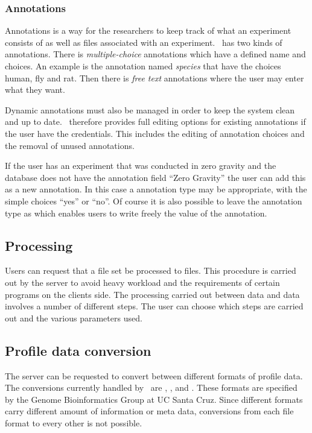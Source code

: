 \subsubsection{Annotations}
Annotations is a way for the researchers to keep track of what an experiment consists of as well as files associated with an experiment.
\appName\ has two kinds of annotations. There is \textit{multiple-choice} annotations which have a defined name and choices. An example is the annotation named \textit{species} that have the choices human, fly and rat.
Then there is \textit{free text} annotations where the user may enter what they want.

Dynamic annotations must also be managed in order to keep the system clean and up to date. \appName\ therefore provides full editing options for existing annotations if the user have the credentials. This includes the editing of  annotation choices and the removal of unused annotations.

\begin{example}
If the user has an experiment that was conducted in zero gravity and the database does not have the annotation field ``Zero Gravity'' the user can add this as a new annotation. In this case a  annotation type may be appropriate, with the simple choices ``yes'' or ``no''. Of course it is also possible to leave the annotation type as  which enables users to write  freely the value of the annotation.
\end{example}

\subsection{Processing}
Users can request that a  file set be processed to  files. This procedure is carried out by the server to avoid heavy workload and the requirements of certain programs on the clients side. The processing carried out between  data and  data involves a number of different steps. The user can choose which steps are carried out and the various parameters used.

\subsection{Profile data conversion}
The server can be requested to convert between different formats of profile data. The conversions currently handled by \appName\ are , ,  and . These formats are specified by the Genome Bioinformatics Group at UC Santa Cruz\cite{des_4}. Since different formats carry different amount of information or meta data, conversions from each file format to every other is not possible.
